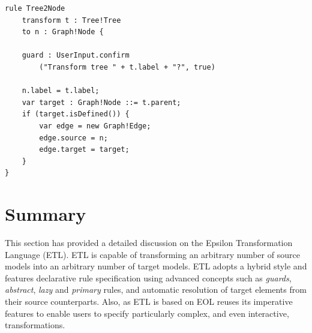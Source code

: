 \begin{lstlisting}[basicstyle=\ttfamily\footnotesize, flexiblecolumns=true, numbers=none, nolol=true, caption=Exemplar Interactive ETL Transformation, label=lst:InteractiveETLTransformationRule, numbers=left, language=ETL, tabsize=2]
rule Tree2Node
	transform t : Tree!Tree
	to n : Graph!Node {
	
	guard : UserInput.confirm
		("Transform tree " + t.label + "?", true)
	
	n.label = t.label;
	var target : Graph!Node ::= t.parent;
	if (target.isDefined()) {
		var edge = new Graph!Edge;
		edge.source = n;
		edge.target = target;
	}
}
\end{lstlisting}

\section{Summary}

This section has provided a detailed discussion on the Epsilon Transformation Language (ETL). ETL is capable of transforming an arbitrary number of source models into an arbitrary number of target models. ETL adopts a hybrid style and features declarative rule specification using advanced concepts such as \emph{guards}, \emph{abstract}, \emph{lazy} and \emph{primary} rules, and automatic resolution of target elements from their source counterparts. Also, as ETL is based on EOL reuses its imperative features to enable users to specify particularly complex, and even interactive, transformations.